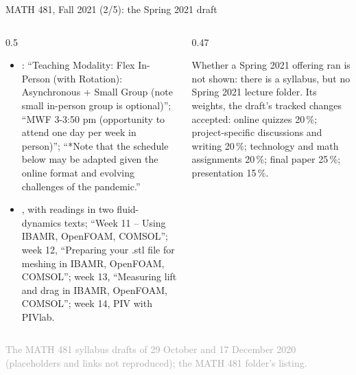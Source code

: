 \documentclass[aspectratio=169,11pt]{beamer}
\newcommand{\sourcecredit}[1]{\vfill\begin{flushright}\tiny\textcolor{DarkGray}{#1}\end{flushright}}
\begin{document}
\begin{frame}{MATH 481, Fall 2021 (2/5): the Spring 2021 draft}
\label{fr:m481a2}
\begin{columns}[T,onlytextwidth]
\begin{column}{0.5\textwidth}
\scriptsize
\begin{itemize}\setlength{\itemsep}{3pt}
  \item {}: ``Teaching Modality: Flex In-Person (with Rotation): Asynchronous + Small Group (note small in-person group is optional)''; ``MWF 3-3:50 pm (opportunity to attend one day per week in person)''; ``*Note that the schedule below may be adapted given the online format and evolving challenges of the pandemic.''
  \item {}, with readings in two fluid-dynamics texts; ``Week 11 -- Using IBAMR, OpenFOAM, COMSOL''; week 12, ``Preparing your .stl file for meshing in IBAMR, OpenFOAM, COMSOL''; week 13, ``Measuring lift and drag in IBAMR, OpenFOAM, COMSOL''; week 14, PIV with PIVlab.
\end{itemize}
\end{column}
\begin{column}{0.47\textwidth}
\begin{punchbox}
\scriptsize Whether a Spring 2021 offering ran is not shown: there is a syllabus, but no Spring 2021 lecture folder. Its weights, the draft's tracked changes accepted: online quizzes 20\,\%; project-specific discussions and writing 20\,\%; technology and math assignments 20\,\%; final paper 25\,\%; presentation 15\,\%.
\end{punchbox}
\end{column}
\end{columns}
\sourcecredit{The MATH 481 syllabus drafts of 29 October and 17 December 2020 (placeholders and links not reproduced); the MATH 481 folder's listing.}
\end{frame}
\end{document}
